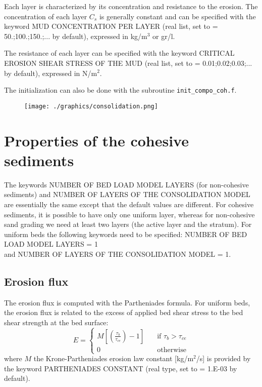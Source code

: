 Each layer is characterized by its concentration and resistance to the erosion. The concentration of each layer $C_s$ is generally constant and can be specified with the keyword {\ttfamily MUD CONCENTRATION PER LAYER} (real list, set to {\ttfamily = 50.;100.;150.;...} by default), expressed in kg/m$^3$ or gr/l.

The resistance of each layer can be specified with the keyword {\ttfamily CRITICAL EROSION SHEAR STRESS OF THE MUD} (real list, set to {\ttfamily = 0.01;0.02;0.03;...} by default), expressed in N/m$^2$.

The initialization can also be done with the subroutine \texttt{init\_compo\_coh.f}.

\begin{figure}[H]%
\begin{center}
\texttt{[image: ./graphics/consolidation.png]}
\end{center}
\end{figure}

\section{Properties of the cohesive sediments}
The keywords {\ttfamily NUMBER OF BED LOAD MODEL LAYERS} (for non-cohesive sediments) and {\ttfamily NUMBER OF LAYERS OF THE CONSOLIDATION MODEL} are essentially the same except that the default values are different. For cohesive sediments, it is possible to have only one uniform layer, whereas for non-cohesive sand grading we need at least two layers (the active layer and the stratum).
For uniform beds the following keywords need to be specified: {\ttfamily NUMBER OF BED LOAD MODEL LAYERS = 1}\\
and {\ttfamily NUMBER OF LAYERS OF THE CONSOLIDATION MODEL = 1}.

\subsection{Erosion flux}
The erosion flux is computed with the Partheniades formula. For uniform beds, the erosion flux is related to the excess of
applied bed shear stress to the bed shear strength at the bed surface:
\begin{equation*}
E = \left\{\begin{array}{ll}
M\left[\left(\frac{\tau_b}{\tau_{ce}}\right)-1\right]\quad & \text{if}\,\,\tau_b> \tau_{ce}\\  
0\quad & \text{otherwise}
\end{array}
\right. 
\end{equation*}
where $M$ the Krone-Partheniades erosion law constant [kg/m$^2$/s] is provided by the keyword {\ttfamily PARTHENIADES CONSTANT} (real type, set to {\ttfamily = 1.E-03} by default).

